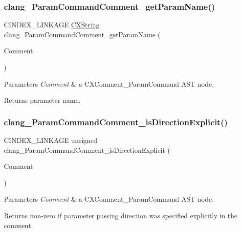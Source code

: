 \subsubsection{\texorpdfstring{clang\+\_\+\+Param\+Command\+Comment\+\_\+get\+Param\+Name()}{clang\_ParamCommandComment\_getParamName()}}
{\footnotesize\ttfamily C\+I\+N\+D\+E\+X\+\_\+\+L\+I\+N\+K\+A\+GE \hyperlink{structCXString}{C\+X\+String} clang\+\_\+\+Param\+Command\+Comment\+\_\+get\+Param\+Name (\begin{DoxyParamCaption}\item[{\hyperlink{structCXComment}{C\+X\+Comment}}]{Comment }\end{DoxyParamCaption})}


\begin{DoxyParams}{Parameters}
{\em Comment} & a {\ttfamily C\+X\+Comment\+\_\+\+Param\+Command} A\+ST node.\\
\hline
\end{DoxyParams}
\begin{DoxyReturn}{Returns}
parameter name. 
\end{DoxyReturn}
\mbox{\label{group__CINDEX__COMMENT_gaf68f19e83ca9b27aec7eb22b065620bd}} 
\subsubsection{\texorpdfstring{clang\+\_\+\+Param\+Command\+Comment\+\_\+is\+Direction\+Explicit()}{clang\_ParamCommandComment\_isDirectionExplicit()}}
{\footnotesize\ttfamily C\+I\+N\+D\+E\+X\+\_\+\+L\+I\+N\+K\+A\+GE unsigned clang\+\_\+\+Param\+Command\+Comment\+\_\+is\+Direction\+Explicit (\begin{DoxyParamCaption}\item[{\hyperlink{structCXComment}{C\+X\+Comment}}]{Comment }\end{DoxyParamCaption})}


\begin{DoxyParams}{Parameters}
{\em Comment} & a {\ttfamily C\+X\+Comment\+\_\+\+Param\+Command} A\+ST node.\\
\hline
\end{DoxyParams}
\begin{DoxyReturn}{Returns}
non-\/zero if parameter passing direction was specified explicitly in the comment. 
\end{DoxyReturn}
\mbox{\label{group__CINDEX__COMMENT_ga92e6422da2a3e428b4452a3e8955ff76}} 
